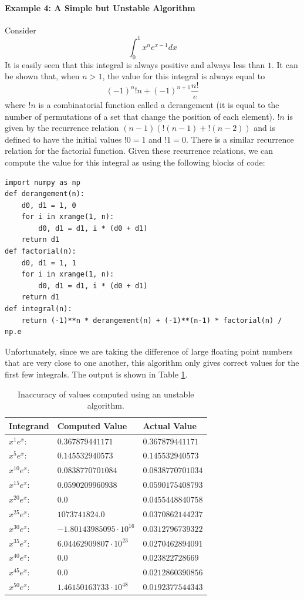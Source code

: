 \paragraph{Example 4: A Simple but Unstable Algorithm}
Consider
\[\int_0^1 x^n e^{x - 1} dx\]
It is easily seen that this integral is always positive and always less than $1$.
It can be shown that, when $n > 1$, the value for this integral is always equal to
\[\left(-1\right)^{n} !n + \left(-1\right)^{n + 1} \frac{n!}{e}\]
where $!n$ is a combinatorial function called a derangement (it is equal to the number of permutations of a set that change the position of each element).
$!n$ is given by the recurrence relation $\left(n - 1\right)\left(!\left(n - 1\right) + !\left(n - 2\right)\right)$ and is defined to have the initial values $!0 = 1$ and $!1 = 0$.
There is a similar recurrence relation for the factorial function.
Given these recurrence relations, we can compute the value for this integral as using the following blocks of code:
\begin{lstlisting}
import numpy as np
def derangement(n):
    d0, d1 = 1, 0
    for i in xrange(1, n):
        d0, d1 = d1, i * (d0 + d1)
    return d1
def factorial(n):
    d0, d1 = 1, 1
    for i in xrange(1, n):
        d0, d1 = d1, i * (d0 + d1)
    return d1
def integral(n):
    return (-1)**n * derangement(n) + (-1)**(n-1) * factorial(n) / np.e
\end{lstlisting}
Unfortunately, since we are taking the difference of large floating point numbers that are very close to one another, this algorithm only gives correct values for the first few integrals.
The output is shown in Table \ref{table:unstable_computation}.

\begin{table}
\centering
\begin{tabular}{|l|l|l|}
\hline
Integrand & Computed Value & Actual Value \\
\hline
$x^{1}e^{x}$: & $0.367879441171$ & $0.367879441171$ \\
$x^{5}e^{x}$: & $0.145532940573$ & $0.145532940573$ \\
$x^{10}e^{x}$: & $0.0838770701084$ & $0.0838770701034$ \\
$x^{15}e^{x}$: & $0.0590209960938$ & $0.0590175408793$ \\
$x^{20}e^{x}$: & $0.0$ & $0.0455448840758$ \\
$x^{25}e^{x}$: & $1073741824.0$ & $0.0370862144237$ \\
$x^{30}e^{x}$: & $-1.80143985095 \cdot 10^{16}$ & $0.0312796739322$ \\
$x^{35}e^{x}$: & $6.04462909807 \cdot 10^{23}$ & $0.0270462894091$ \\
$x^{40}e^{x}$: & $0.0$ & $0.023822728669$ \\
$x^{45}e^{x}$: & $0.0$ & $0.0212860390856$ \\
$x^{50}e^{x}$: & $1.46150163733 \cdot 10^{48}$ & $0.0192377544343$ \\
\hline
\end{tabular}
\caption{Inaccuracy of values computed using an unstable algorithm.}
\label{table:unstable_computation}
\end{table}

